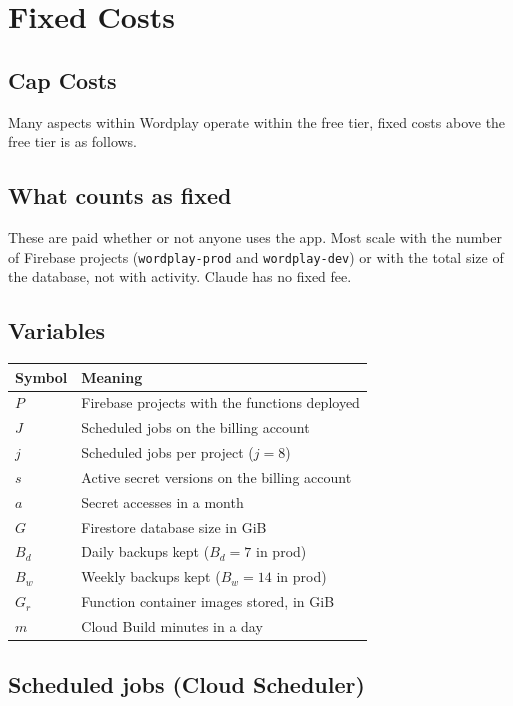 \documentclass{article}
\begin{document}
\section{Fixed Costs}
\subsection{Cap Costs}
Many aspects within Wordplay operate within the free tier, fixed costs above the free tier is as follows. 

\subsection{What counts as fixed}

These are paid whether or not anyone uses the app. Most scale with the number
of Firebase projects (\texttt{wordplay-prod} and \texttt{wordplay-dev}) or with
the total size of the database, not with activity. Claude has no fixed fee.

\subsection{Variables}

\begin{center}
\begin{tabular}{ll}
\toprule
Symbol & Meaning \\
\midrule
$P$ & Firebase projects with the functions deployed \\
$J$ & Scheduled jobs on the billing account \\
$j$ & Scheduled jobs per project ($j = 8$) \\
$s$ & Active secret versions on the billing account \\
$a$ & Secret accesses in a month \\
$G$ & Firestore database size in GiB \\
$B_d$ & Daily backups kept ($B_d = 7$ in prod) \\
$B_w$ & Weekly backups kept ($B_w = 14$ in prod) \\
$G_r$ & Function container images stored, in GiB \\
$m$ & Cloud Build minutes in a day \\
\bottomrule
\end{tabular}
\end{center}

\subsection{Scheduled jobs (Cloud Scheduler)}
\end{document}
